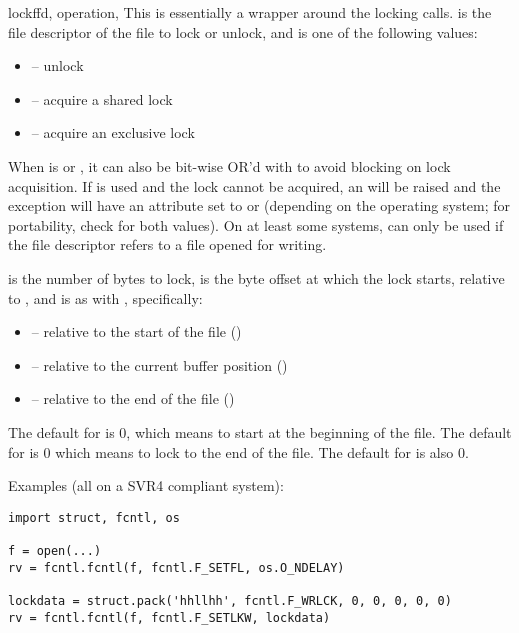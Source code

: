 \begin{funcdesc}{lockf}{fd, operation,
    }
This is essentially a wrapper around the  locking
calls.   is the file descriptor of the file to lock or unlock,
and  is one of the following values:

\begin{itemize}
\item {} -- unlock
\item {} -- acquire a shared lock
\item {} -- acquire an exclusive lock
\end{itemize}

When  is  or , it
can also be bit-wise OR'd with  to avoid blocking on
lock acquisition.  If  is used and the lock cannot
be acquired, an  will be raised and the exception
will have an  attribute set to  or
 (depending on the operating system; for portability,
check for both values).  On at least some systems, 
can only be used if the file descriptor refers to a file opened for
writing.

 is the number of bytes to lock,  is the byte
offset at which the lock starts, relative to , and
 is as with , specifically:

\begin{itemize}
\item {} -- relative to the start of the file
      ()
\item {} -- relative to the current buffer position
      ()
\item {} -- relative to the end of the file
      ()
\end{itemize}

The default for  is 0, which means to start at the
beginning of the file.  The default for  is 0 which means
to lock to the end of the file.  The default for  is also
0.
\end{funcdesc}

Examples (all on a SVR4 compliant system):

\begin{verbatim}
import struct, fcntl, os

f = open(...)
rv = fcntl.fcntl(f, fcntl.F_SETFL, os.O_NDELAY)

lockdata = struct.pack('hhllhh', fcntl.F_WRLCK, 0, 0, 0, 0, 0)
rv = fcntl.fcntl(f, fcntl.F_SETLKW, lockdata)
\end{verbatim}

